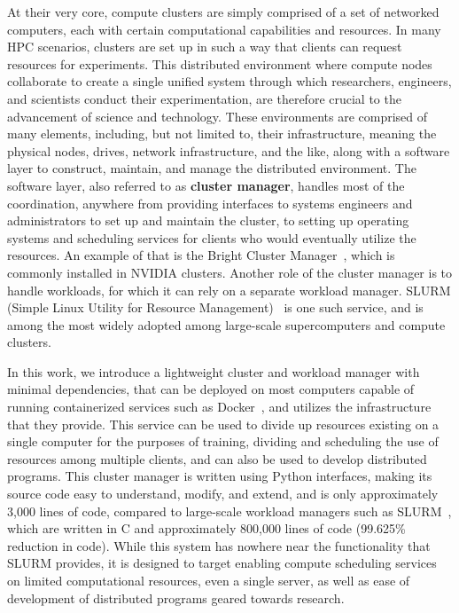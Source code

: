 \documentclass[sigconf]{acmart}
\begin{document}
At their very core, compute clusters are simply comprised of a set of networked computers, 
each with certain computational capabilities and resources.
In many HPC scenarios, clusters are set up in such a way that clients can request resources for experiments.
This distributed environment where compute nodes collaborate to create a single unified system through which researchers, 
engineers, and scientists conduct their experimentation, are therefore crucial to the advancement of science and technology.
These environments are comprised of many elements, including, but not limited to, their infrastructure, meaning the physical
nodes, drives, network infrastructure, and the like, along with a software layer to construct, maintain, and manage the 
distributed environment.
The software layer, also referred to as \textbf{cluster manager}, handles most of the coordination, anywhere from providing 
interfaces to systems engineers and administrators to set up and maintain the cluster, to setting up operating systems and 
scheduling services for clients who would eventually utilize the resources.
An example of that is the Bright Cluster Manager~\cite{bright}, which is commonly installed in NVIDIA clusters.
Another role of the cluster manager is to handle workloads, for which it can rely on a separate workload manager.
SLURM (Simple Linux Utility for Resource Management)~\cite{yoo2003slurm} is one such service, and is among the most widely 
adopted among large-scale supercomputers and compute clusters.

In this work, we introduce a lightweight cluster and workload manager with minimal dependencies, that can be
deployed on most computers capable of running containerized services such as Docker~\cite{merkel2014docker}, and utilizes the
infrastructure that they provide.
This service can be used to divide up resources existing on a single computer for the purposes of training, dividing and
scheduling the use of resources among multiple clients, and can also be used to develop distributed programs.
This cluster manager is written using Python interfaces, making its source code easy to understand, modify, and extend, and is
only approximately 3,000 lines of code, compared to large-scale workload managers such as SLURM~\cite{yoo2003slurm}, which are
written in C and approximately 800,000 lines of code (99.625\% reduction in code).
While this system has nowhere near the functionality that SLURM provides, it is designed to target enabling compute scheduling
services on limited computational resources, even a single server, as well as ease of development of distributed programs geared
towards research.
\end{document}
